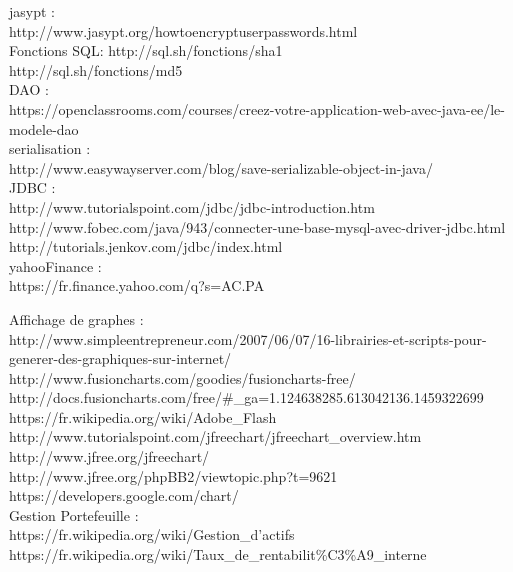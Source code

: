 jasypt :\\
http://www.jasypt.org/howtoencryptuserpasswords.html\\

Fonctions SQL:
http://sql.sh/fonctions/sha1 \\
http://sql.sh/fonctions/md5\\

DAO :\\
https://openclassrooms.com/courses/creez-votre-application-web-avec-java-ee/le-modele-dao\\
serialisation : \\
http://www.easywayserver.com/blog/save-serializable-object-in-java/ \\

JDBC : \\
http://www.tutorialspoint.com/jdbc/jdbc-introduction.htm\\
http://www.fobec.com/java/943/connecter-une-base-mysql-avec-driver-jdbc.html\\
http://tutorials.jenkov.com/jdbc/index.html\\

yahooFinance : \\
https://fr.finance.yahoo.com/q?s=AC.PA

Affichage de graphes :\\
http://www.simpleentrepreneur.com/2007/06/07/16-librairies-et-scripts-pour-generer-des-graphiques-sur-internet/ \\
http://www.fusioncharts.com/goodies/fusioncharts-free/ \\
http://docs.fusioncharts.com/free/\#\_ga=1.124638285.613042136.1459322699 \\
https://fr.wikipedia.org/wiki/Adobe\_Flash \\
http://www.tutorialspoint.com/jfreechart/jfreechart\_overview.htm \\
http://www.jfree.org/jfreechart/ \\
http://www.jfree.org/phpBB2/viewtopic.php?t=9621 \\
https://developers.google.com/chart/ \\


Gestion Portefeuille : \\
https://fr.wikipedia.org/wiki/Gestion\_d'actifs \\
https://fr.wikipedia.org/wiki/Taux\_de\_rentabilit\%C3\%A9\_interne